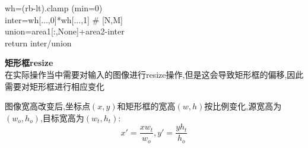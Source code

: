\begin{frame}
    \vspace{0.2em}
    \qquad\textcolor{vscodeparameter}{wh}=\textcolor{vscodebracket}{(}\textcolor{vscodeparameter}{rb}-\textcolor{vscodeparameter}{lt}\textcolor{vscodebracket}{)}.\textcolor{vscodefuncation}{clamp}
    \textcolor{vscodebracket}{(}\textcolor{vscodeparameter}{min}=\textcolor{vscodecomment}{0}\textcolor{vscodebracket}{)}\\
    \vspace{0.2em}
    \qquad\textcolor{vscodeparameter}{inter}=\textcolor{vscodeparameter}{wh}\textcolor{vscodebracket}{[}...,\textcolor{vscodecomment}{0}\textcolor{vscodebracket}{]}*\textcolor{vscodeparameter}{wh}\textcolor{vscodebracket}{[}...,\textcolor{vscodecomment}{1}\textcolor{vscodebracket}{]}  \textcolor{vscodecomment}{\# [N,M]}\\
    \vspace{0.2em}
    \qquad\textcolor{vscodeparameter}{union}=\textcolor{vscodeparameter}{area1}\textcolor{vscodebracket}{[}:,\textcolor{vscodedef}{None}\textcolor{vscodebracket}{]}+\textcolor{vscodeparameter}{area2}-\textcolor{vscodeparameter}{inter}\\
    \vspace{0.2em}
    \qquad\textcolor{vscodereturn}{return} \textcolor{vscodeparameter}{inter}/\textcolor{vscodeparameter}{union}
\end{frame}

\begin{frame}
    \vspace{1em}
    \noindent\large\textbf{矩形框resize}\\
    \vspace{1em}
    在实际操作当中需要对输入的图像进行resize操作,但是这会导致矩形框的偏移,因此需要对矩形框进行相应变化\\
    \begin{figure}
        \hspace{1cm}
    \end{figure}
    图像宽高改变后,坐标点$(x,y)$和矩形框的宽高$(w,h)$按比例变化,源宽高为$(w_o,h_o)$,目标宽高为$(w_t,h_t)$:
    $$x'=\frac{xw_t}{w_o},y'=\frac{yh_t}{h_o}$$
\end{frame}

